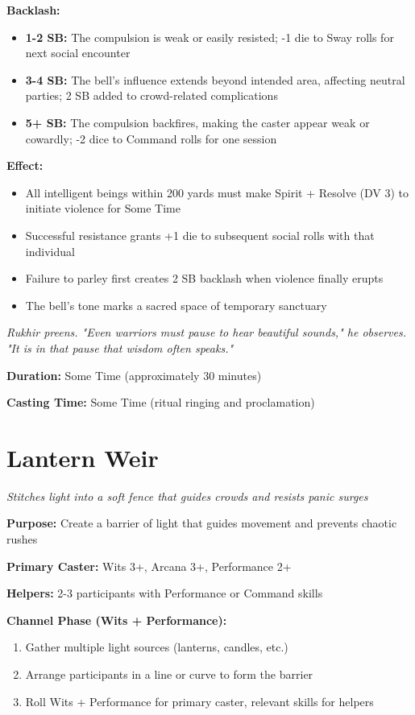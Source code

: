 \documentclass[12pt,twoside]{book}
\newcommand{\shadow}[1]{\textit{#1}}
\begin{document}
\textbf{Backlash:}
\begin{itemize}
\item \textbf{1-2 SB:} The compulsion is weak or easily resisted; -1 die to Sway rolls for next social encounter
\item \textbf{3-4 SB:} The bell's influence extends beyond intended area, affecting neutral parties; 2 SB added to crowd-related complications
\item \textbf{5+ SB:} The compulsion backfires, making the caster appear weak or cowardly; -2 dice to Command rolls for one session
\end{itemize}

\textbf{Effect:}
\begin{itemize}
\item All intelligent beings within 200 yards must make Spirit + Resolve (DV 3) to initiate violence for Some Time
\item Successful resistance grants +1 die to subsequent social rolls with that individual
\item Failure to parley first creates 2 SB backlash when violence finally erupts
\item The bell's tone marks a sacred space of temporary sanctuary
\end{itemize}

\shadow{Rukhir preens. "Even warriors must pause to hear beautiful sounds," he observes. "It is in that pause that wisdom often speaks."}

\textbf{Duration:} Some Time (approximately 30 minutes)

\textbf{Casting Time:} Some Time (ritual ringing and proclamation)

\section*{Lantern Weir}
\textit{Stitches light into a soft fence that guides crowds and resists panic surges}

\textbf{Purpose:} Create a barrier of light that guides movement and prevents chaotic rushes

\textbf{Primary Caster:} Wits 3+, Arcana 3+, Performance 2+

\textbf{Helpers:} 2-3 participants with Performance or Command skills

\textbf{Channel Phase (Wits + Performance):}
\begin{enumerate}
\item Gather multiple light sources (lanterns, candles, etc.)
\item Arrange participants in a line or curve to form the barrier
\item Roll Wits + Performance for primary caster, relevant skills for helpers
\end{enumerate}
\end{document}
